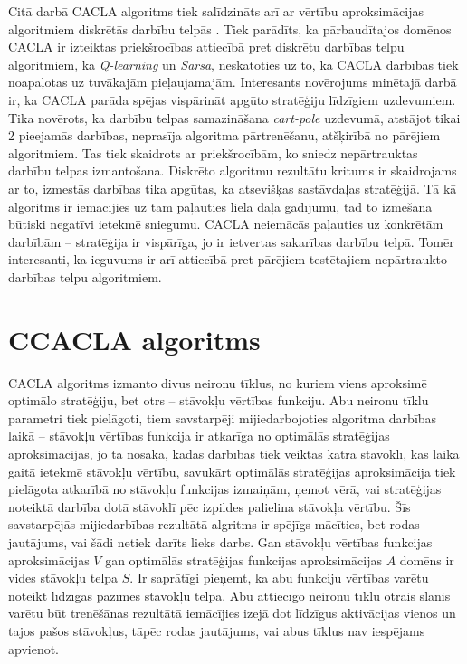 \documentclass{ludis} %
\begin{document}
Citā darbā CACLA algoritms tiek salīdzināts arī ar vērtību aproksimācijas
algoritmiem diskrētās darbību telpās \autocite{Hasselt2009}. Tiek parādīts, ka
pārbaudītajos domēnos CACLA ir izteiktas priekšrocības attiecībā pret diskrētu
darbības telpu algoritmiem, kā \textit{Q-learning} un \textit{Sarsa},
neskatoties uz to, ka CACLA darbības tiek noapaļotas uz tuvākajām pieļaujamajām.
Interesants novērojums minētajā darbā ir, ka CACLA parāda spējas vispārināt
apgūto stratēģiju līdzīgiem uzdevumiem. Tika novērots, ka darbību telpas
samazināšana \textit{cart-pole} uzdevumā, atstājot tikai 2 pieejamās darbības,
neprasīja algoritma pārtrenēšanu, atšķirībā no pārējiem algoritmiem. Tas tiek
skaidrots ar priekšrocībām, ko sniedz nepārtrauktas darbību telpas izmantošana.
Diskrēto algoritmu rezultātu kritums ir skaidrojams ar to, izmestās darbības
tika apgūtas, ka atsevišķas sastāvdaļas stratēģijā. Tā kā algoritms ir
iemācījies uz tām paļauties lielā daļā gadījumu, tad to izmešana būtiski
negatīvi ietekmē sniegumu. CACLA neiemācās paļauties uz konkrētām darbībām --
stratēģija ir vispārīga, jo ir ietvertas sakarības darbību telpā. Tomēr
interesanti, ka ieguvums ir arī attiecībā pret pārējiem testētajiem nepārtraukto
darbības telpu algoritmiem.

\section{CCACLA algoritms}\label{sec:ccacla}
CACLA algoritms izmanto divus neironu tīklus, no kuriem viens aproksimē optimālo
stratēģiju, bet otrs -- stāvokļu vērtības funkciju. Abu neironu tīklu parametri
tiek pielāgoti, tiem savstarpēji mijiedarbojoties algoritma darbības laikā --
stāvokļu vērtības funkcija ir atkarīga no optimālās stratēģijas aproksimācijas,
jo tā nosaka, kādas darbības tiek veiktas katrā stāvoklī, kas laika gaitā
ietekmē stāvokļu vērtību, savukārt optimālās stratēģijas aproksimācija tiek
pielāgota atkarībā no stāvokļu funkcijas izmaiņām, ņemot vērā, vai stratēģijas
noteiktā darbība dotā stāvoklī pēc izpildes palielina stāvokļa vērtību. Šīs
savstarpējās mijiedarbības rezultātā algritms ir spējīgs mācīties, bet rodas
jautājums, vai šādi netiek darīts lieks darbs. Gan stāvokļu vērtības funkcijas
aproksimācijas $V$ gan optimālās stratēģijas funkcijas aproksimācijas $A$ domēns
ir vides stāvokļu telpa $S$. Ir saprātīgi pieņemt, ka abu funkciju vērtības
varētu noteikt līdzīgas pazīmes stāvokļu telpā. Abu attiecīgo neironu tīklu
otrais slānis varētu būt trenēšānas rezultātā iemācījies izejā dot līdzīgus
aktivācijas vienos un tajos pašos stāvokļus, tāpēc rodas jautājums, vai abus
tīklus nav iespējams apvienot.
\end{document}
